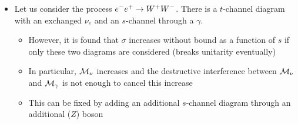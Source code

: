 \begin{itemize}
\begin{equation}
  \end{equation}
  \item Let us consider the process $e^{-}e^{+} \rightarrow W^+ W^-$. There is a $t$-channel diagram with an exchanged $\nu_e$ and an $s$-channel through a $\gamma$. 
  \begin{itemize}
    \item However, it is found that $\sigma$ increases without bound as a function of $s$ if only these two diagrams are considered (breaks unitarity eventually)
    \item In particular, $\mathcal{M}_\nu$ increases and the destructive interference between $\mathcal{M}_\nu$ and $\mathcal{M}_\gamma$ is not enough to cancel this increase
    \item This can be fixed by adding an additional $s$-channel diagram through an additional ($Z$) boson
  \end{itemize}
\end{itemize}

